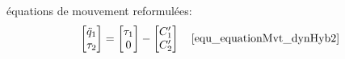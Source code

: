 \documentclass[10pt]{beamer}
\begin{document}
\begin{frame}
\begin{columns}[T]
\begin{column}{.37\textwidth}
\begin{block}{\footnotesize{équations de mouvement reformulées:}}
\begin{align*}
\begin{bmatrix}
		  \ddot{q}_1 \\
		  \tau_2
		\end{bmatrix} 
		&=
		\begin{bmatrix}
		  \tau_1 \\
		  0
		\end{bmatrix} 
		-
		\begin{bmatrix}
		  C'_{1} \\
		  C'_{2}
		\end{bmatrix} \quad \eqref{equ_equationMvt_dynHyb2} \\
		\end{align*}
	\end{block}
  \end{column}
  \end{columns}
  \vfill

\end{frame}
\end{document}
